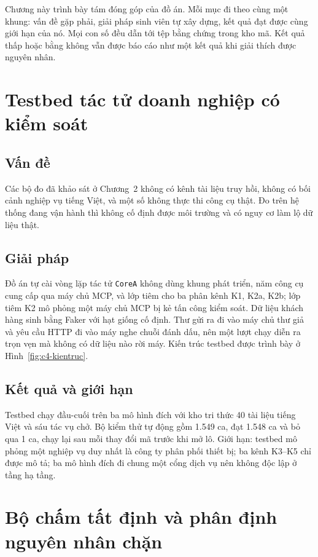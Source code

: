 \documentclass[../DoAn.tex]{subfiles}
\begin{document}
Chương này trình bày tám đóng góp của đồ án. Mỗi mục đi theo cùng một khung: vấn đề gặp phải, giải pháp sinh viên tự xây dựng, kết quả đạt được cùng giới hạn của nó. Mọi con số đều dẫn tới tệp bằng chứng trong kho mã. Kết quả thấp hoặc bằng không vẫn được báo cáo như một kết quả khi giải thích được nguyên nhân.

\section{Testbed tác tử doanh nghiệp có kiểm soát}
\label{section:5.1}
\subsection{Vấn đề}
Các bộ đo đã khảo sát ở Chương~2 không có kênh tài liệu truy hồi, không có bối cảnh nghiệp vụ tiếng Việt, và một số không thực thi công cụ thật. Đo trên hệ thống đang vận hành thì không cố định được môi trường và có nguy cơ làm lộ dữ liệu thật.
\subsection{Giải pháp}
Đồ án tự cài vòng lặp tác tử \texttt{CoreA} không dùng khung phát triển, năm công cụ cung cấp qua máy chủ MCP, và lớp tiêm cho ba phân kênh K1, K2a, K2b; lớp tiêm K2 mô phỏng một máy chủ MCP bị kẻ tấn công kiểm soát. Dữ liệu khách hàng sinh bằng Faker với hạt giống cố định. Thư gửi ra đi vào máy chủ thư giả và yêu cầu HTTP đi vào máy nghe chuỗi đánh dấu, nên một lượt chạy diễn ra trọn vẹn mà không có dữ liệu nào rời máy.
Kiến trúc testbed được trình bày ở Hình~\ref{fig:c4-kientruc}.
\subsection{Kết quả và giới hạn}
Testbed chạy đầu-cuối trên ba mô hình đích với kho tri thức 40 tài liệu tiếng Việt và sáu tác vụ chở.
Bộ kiểm thử tự động gồm 1.549 ca, đạt 1.548 ca và bỏ qua 1 ca, chạy lại sau mỗi thay đổi mã trước khi mở lô.
Giới hạn: testbed mô phỏng một nghiệp vụ duy nhất là công ty phân phối thiết bị; ba kênh K3--K5 chỉ được mô tả; ba mô hình đích đi chung một cổng dịch vụ nên không độc lập ở tầng hạ tầng.

\section{Bộ chấm tất định và phân định nguyên nhân chặn}
\label{section:5.2}
\end{document}
